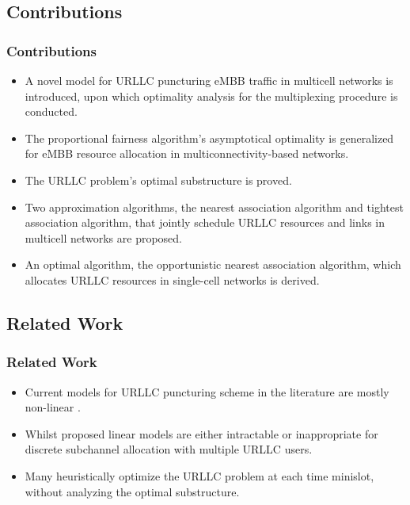 \subsection{Contributions}
\begin{frame}
  \frametitle{Contributions}
  \begin{itemize}
    \item A novel  model for URLLC puncturing eMBB traffic in multicell networks is introduced, upon which optimality analysis for the multiplexing procedure is conducted.
    \item The proportional fairness algorithm's asymptotical optimality \cite{KW02} is generalized for eMBB resource allocation in multiconnectivity-based networks.
    \item The URLLC problem's optimal substructure is proved.
    \item Two approximation algorithms, the nearest association algorithm and tightest association algorithm, that jointly schedule URLLC resources and links in multicell networks are proposed.
    \item An optimal algorithm, the opportunistic nearest association algorithm, which allocates URLLC resources in single-cell networks is derived.
  \end{itemize}
\end{frame}

\subsection{Related Work}
\begin{frame}
  \frametitle{Related Work}
  \begin{itemize}
    \item Current models for URLLC puncturing scheme in the literature are mostly non-linear \cite{BMATAMHH21}.
    \item Whilst proposed linear models are either intractable \cite{YZR21} or inappropriate \cite{AVS20} for discrete subchannel allocation with multiple URLLC users.
    \item Many \cite{BMATAMHH21, YZR21} heuristically optimize the URLLC problem at each time minislot, without analyzing the optimal substructure.
  \end{itemize}
\end{frame}
